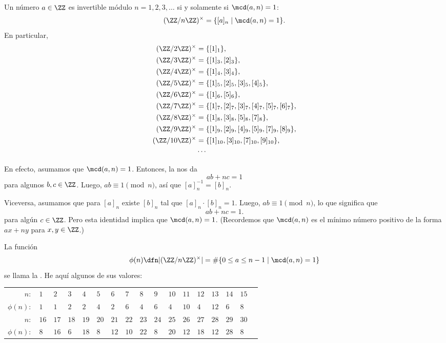 \begin{ejemplo}
  \label{ejemplo:grupo-de-unidades-de-ZnZ}
  Un número $a\in \ZZ$ es invertible módulo $n = 1,2,3,\ldots$ si y solamente si
  $\mcd (a,n) = 1$:
  $$(\ZZ/n\ZZ)^\times = \{ [a]_n \mid \mcd (a,n) = 1 \}.$$
  En particular,
  \begin{align*}
    (\ZZ/2\ZZ)^\times & = \{ [1]_1 \},\\
    (\ZZ/3\ZZ)^\times & = \{ [1]_3, [2]_3 \},\\
    (\ZZ/4\ZZ)^\times & = \{ [1]_4, [3]_4 \},\\
    (\ZZ/5\ZZ)^\times & = \{ [1]_5, [2]_5, [3]_5, [4]_5 \},\\
    (\ZZ/6\ZZ)^\times & = \{ [1]_6, [5]_6 \},\\
    (\ZZ/7\ZZ)^\times & = \{ [1]_7, [2]_7, [3]_7, [4]_7, [5]_7, [6]_7 \},\\
    (\ZZ/8\ZZ)^\times & = \{ [1]_8, [3]_8, [5]_8, [7]_8 \},\\
    (\ZZ/9\ZZ)^\times & = \{ [1]_9, [2]_9, [4]_9, [5]_9, [7]_9, [8]_9 \},\\
    (\ZZ/10\ZZ)^\times & = \{ [1]_{10}, [3]_{10}, [7]_{10}, [9]_{10} \},\\
                      & \cdots
  \end{align*}

  En efecto, asumamos que $\mcd (a,n) = 1$. Entonces, la
   nos da
  $$ab + nc = 1$$
  para algunos $b,c \in \ZZ$. Luego, $ab \equiv 1 \pmod{n}$, así que
  $[a]_n^{-1} = [b]_n$.

  Viceversa, asumamos que para $[a]_n$ existe $[b]_n$ tal que
  $[a]_n\cdot [b]_n = 1$. Luego, $ab \equiv 1 \pmod{n}$, lo que significa que
  $$ab + nc = 1.$$
  para algún $c \in \ZZ$. Pero esta identidad implica que
  $\mcd (a,n) = 1$. (Recordemos que $\mcd (a,n)$ es el mínimo número positivo de
  la forma $ax + ny$ para $x,y\in\ZZ$.)
\end{ejemplo}

La función
$$\phi (n) \dfn |(\ZZ/n\ZZ)^\times| = \# \{ 0 \le a \le n-1 \mid \mcd (a,n) = 1 \}$$
se llama la
. He aquí
algunos de sus valores:

\begin{center}\small
  \begin{tabular}{rx{0.35cm}x{0.35cm}x{0.35cm}x{0.35cm}x{0.35cm}x{0.35cm}x{0.35cm}x{0.35cm}x{0.35cm}x{0.35cm}x{0.35cm}x{0.35cm}x{0.35cm}x{0.35cm}x{0.35cm}x{0.35cm}}
    \hline
    $n\colon$ & $1$ & $2$ & $3$ & $4$ & $5$ & $6$ & $7$ & $8$ & $9$ & $10$ & $11$ & $12$ & $13$ & $14$ & $15$  \tabularnewline
    $\phi (n)\colon$ & $1$ & $1$ & $2$ & $2$ & $4$ & $2$ & $6$ & $4$ & $6$ & $4$ & $10$ & $4$ & $12$ & $6$ & $8$ \tabularnewline
    \hline
    $n\colon$ & $16$ & $17$ & $18$ & $19$ & $20$ & $21$ & $22$ & $23$ & $24$ & $25$ & $26$ & $27$ & $28$ & $29$ & $30$ \tabularnewline
    $\phi (n)\colon$ & $8$ & $16$ & $6$ & $18$ & $8$ & $12$ & $10$ & $22$ & $8$ & $20$ & $12$ & $18$ & $12$ & $28$ & $8$ \tabularnewline
    \hline
  \end{tabular}
\end{center}

